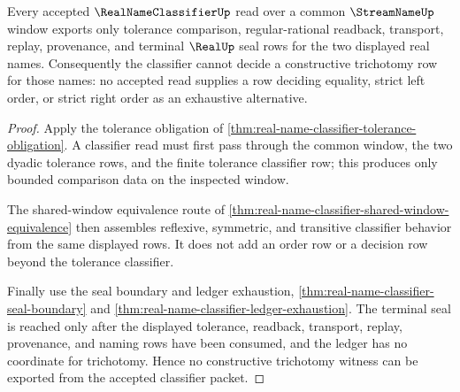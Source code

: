 \begin{theorem}
\label{thm:real-name-classifier-window-trichotomy-refusal}
Every accepted $\RealNameClassifierUp$ read over a common $\StreamNameUp$ window exports only tolerance comparison, regular-rational readback, transport, replay, provenance, and terminal $\RealUp$ seal rows for the two displayed real names. Consequently the classifier cannot decide a constructive trichotomy row for those names: no accepted read supplies a row deciding equality, strict left order, or strict right order as an exhaustive alternative.
\end{theorem}
\begin{proof}
Apply the tolerance obligation of \autoref{thm:real-name-classifier-tolerance-obligation}. A classifier read must first pass through the common window, the two dyadic tolerance rows, and the finite tolerance classifier row; this produces only bounded comparison data on the inspected window.

The shared-window equivalence route of \autoref{thm:real-name-classifier-shared-window-equivalence} then assembles reflexive, symmetric, and transitive classifier behavior from the same displayed rows. It does not add an order row or a decision row beyond the tolerance classifier.

Finally use the seal boundary and ledger exhaustion, \autoref{thm:real-name-classifier-seal-boundary} and \autoref{thm:real-name-classifier-ledger-exhaustion}. The terminal seal is reached only after the displayed tolerance, readback, transport, replay, provenance, and naming rows have been consumed, and the ledger has no coordinate for trichotomy. Hence no constructive trichotomy witness can be exported from the accepted classifier packet.
\end{proof}

